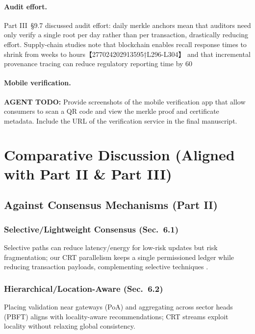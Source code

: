 \paragraph{Audit effort.}
Part III~\S9.7 discussed audit effort: daily merkle anchors mean that auditors need only verify a single root per day rather than per transaction, drastically reducing effort.  Supply‑chain studies note that blockchain enables recall response times to shrink from weeks to hours【277024202913595†L296-L304】 and that incremental provenance tracing can reduce regulatory reporting time by 60 %

\paragraph{Mobile verification.}
\textbf{AGENT TODO:} Provide screenshots of the mobile verification app that allow consumers to scan a QR code and view the merkle proof and certificate metadata.  Include the URL of the verification service in the final manuscript.


\section{Comparative Discussion (Aligned with Part II \& Part III)}

\subsection{Against Consensus Mechanisms (Part II)}
\subsubsection{Selective/Lightweight Consensus (Sec.~6.1)}
Selective paths can reduce latency/energy for low-risk updates but risk fragmentation; our CRT parallelism keeps a single permissioned ledger while reducing transaction payloads, complementing selective techniques \cite{ali2022blockchainenabledarchitecture}.

\subsubsection{Hierarchical/Location-Aware (Sec.~6.2)}
Placing validation near gateways (PoA) and aggregating across sector heads (PBFT) aligns with locality-aware recommendations; CRT streams exploit locality without relaxing global consistency.

